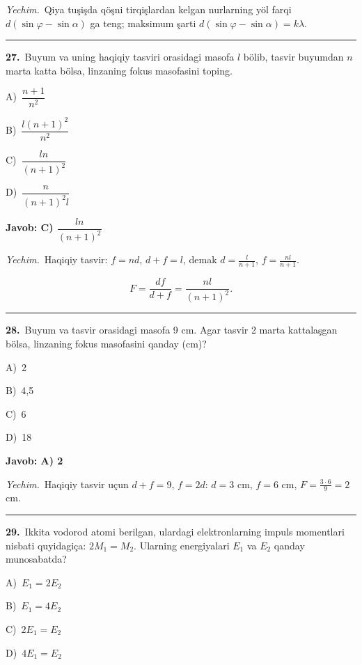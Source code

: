 \documentclass[11pt,a4paper]{article}
\newcommand{\opt}[2]{\hspace*{4mm}#1)\ #2\par}
\begin{document}
\noindent\textit{Yechim.}\ Qiya tuşişda qöşni tirqişlardan kelgan nurlarning yöl farqi $d(\sin\varphi-\sin\alpha)$ ga teng; maksimum şarti $d(\sin\varphi-\sin\alpha)=k\lambda$.\par\par\medskip\hrule\medskip
{}\noindent\begin{minipage}{\linewidth}
\textbf{27.}\ Buyum va uning haqiqiy tasviri orasidagi masofa $l$ bölib, tasvir buyumdan $n$ marta katta bölsa, linzaning fokus masofasini toping.\par\smallskip
\opt{A}{$\dfrac{n+1}{n^2}$}
\opt{B}{$\dfrac{l(n+1)^2}{n^2}$}
\opt{C}{$\dfrac{ln}{(n+1)^2}$}
\opt{D}{$\dfrac{n}{(n+1)^2l}$}
\end{minipage}\vspace{2pt}\par
\noindent\colorbox{gray!12}{\parbox{\dimexpr\linewidth-2\fboxsep}{\textbf{Javob: C) $\dfrac{ln}{(n+1)^2}$}}}\par\smallskip
\noindent\textit{Yechim.}\ Haqiqiy tasvir: $f=nd$, $d+f=l$, demak $d=\frac{l}{n+1}$, $f=\frac{nl}{n+1}$.\par
\[F=\frac{df}{d+f}=\frac{nl}{(n+1)^2}.\]\par\medskip\hrule\medskip
{}\noindent\begin{minipage}{\linewidth}
\textbf{28.}\ Buyum va tasvir orasidagi masofa 9 cm. Agar tasvir 2 marta kattalaşgan bölsa, linzaning fokus masofasini qanday (cm)?\par\smallskip
\opt{A}{2}
\opt{B}{4,5}
\opt{C}{6}
\opt{D}{18}
\end{minipage}\vspace{2pt}\par
\noindent\colorbox{gray!12}{\parbox{\dimexpr\linewidth-2\fboxsep}{\textbf{Javob: A) 2}}}\par\smallskip
\noindent\textit{Yechim.}\ Haqiqiy tasvir uçun $d+f=9$, $f=2d$: $d=3$ cm, $f=6$ cm, $F=\frac{3\cdot6}{9}=2$ cm.\par\par\medskip\hrule\medskip
{}\noindent\begin{minipage}{\linewidth}
\textbf{29.}\ Ikkita vodorod atomi berilgan, ulardagi elektronlarning impuls momentlari nisbati quyidagiça: $2M_1 = M_2$. Ularning energiyalari $E_1$ va $E_2$ qanday munosabatda?\par\smallskip
\opt{A}{$E_1 = 2E_2$}
\opt{B}{$E_1 = 4E_2$}
\opt{C}{$2E_1 = E_2$}
\opt{D}{$4E_1 = E_2$}
\end{minipage}\vspace{2pt}\par
\end{document}
